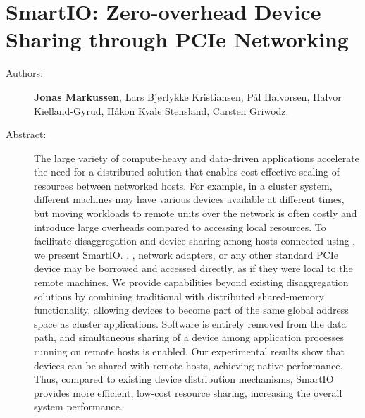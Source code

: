 \chapter{SmartIO: Zero-overhead Device Sharing through PCIe Networking}
\label{paper:tocs}
\paperthumb

\begin{description}
	\item[Authors:]
		\textbf{Jonas Markussen}, Lars Bj{\o}rlykke Kristiansen, P{\aa}l Halvorsen,
		Halvor Kielland-Gyrud, H{\aa}kon Kvale Stensland, Carsten Griwodz.

	\item[Abstract:]
		The large variety of compute-heavy and data-driven applications accelerate the need for a distributed
		 solution that enables cost-effective scaling of resources between networked hosts. For example,
		in a cluster system, different machines may have various devices available at different times, 
		but moving workloads to remote units over the network is often costly and introduce 
		large overheads compared to accessing local resources. 
        To facilitate  \gls{disaggregation} and device sharing among hosts connected using  
		, we present SmartIO. , , network adapters, 
		or any other standard PCIe device may be borrowed and accessed directly, as if they were local to the remote machines.
		We provide capabilities beyond existing \gls{disaggregation} solutions 
		by combining traditional  with distributed shared-memory functionality, allowing devices 
		to become part of the same global address space as cluster applications.
		Software is entirely removed from the data path, and simultaneous sharing of a device among 
		application processes running on remote hosts is enabled.
		Our experimental results show that  devices can be shared with remote hosts,
		achieving native  performance.
		Thus, compared to existing device distribution mechanisms, SmartIO provides more efficient, low-cost resource
		sharing, increasing the overall system performance.


\end{description}
